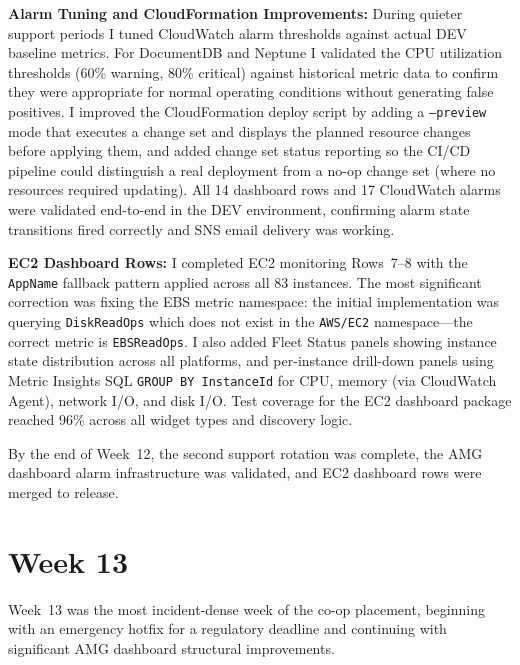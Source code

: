 \textbf{Alarm Tuning and CloudFormation Improvements:} 
During quieter support periods I tuned CloudWatch alarm thresholds against
actual DEV baseline metrics. For DocumentDB and Neptune I validated the CPU utilization thresholds (60\% warning, 80\% critical) against historical metric data to confirm they were appropriate for normal operating conditions without generating false positives. I improved the CloudFormation deploy script by adding a \texttt{--preview} mode that executes a change set and displays the planned resource changes before applying them, and added change set status reporting so the CI/CD pipeline could distinguish a real deployment from a no-op change set (where no resources required updating). All 14 dashboard rows and 17 CloudWatch alarms were validated end-to-end in the DEV environment, confirming alarm state transitions fired correctly and SNS email delivery was working.

\textbf{EC2 Dashboard Rows:} 
I completed EC2 monitoring Rows~7--8 with the \texttt{AppName} fallback pattern applied across all 83 instances. The most significant correction was fixing the EBS metric namespace: the initial implementation was querying \texttt{DiskReadOps} which does not exist in the \texttt{AWS/EC2} namespace---the correct metric is \texttt{EBSReadOps}. I also added Fleet Status panels showing instance state distribution across all platforms, and per-instance drill-down panels using Metric Insights SQL \texttt{GROUP BY InstanceId} for CPU, memory (via CloudWatch Agent), network I/O, and disk I/O. Test coverage for the EC2 dashboard package reached 96\% across all widget types and discovery logic.

By the end of Week~12, the second support rotation was complete, the AMG dashboard
alarm infrastructure was validated, and EC2 dashboard rows were merged
to release.


\FloatBarrier

\section{Week 13}
\label{sec:week13}

Week~13 was the most incident-dense week of the co-op placement, beginning
with an emergency hotfix for a regulatory deadline and continuing with
significant AMG dashboard structural improvements.

